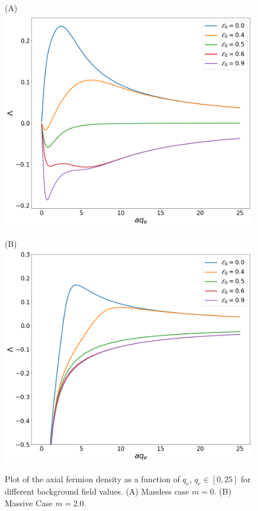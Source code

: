 \begin{figure}[h]
	\begin{minipage}{.5\textwidth}
		\centering(A)
		\includegraphics[scale=0.18]{figures/axial_m=00.png}
	\end{minipage}%
	\begin{minipage}{0.5\textwidth}
		\centering(B)
		\includegraphics[scale=0.18]{figures/axial_m=20.png}
	\end{minipage}
	\caption{Plot of the axial fermion density as a function of $q_e$, $q_e\in[0,25]$ for different background field values. (A) Massless case $m=0$. (B) Massive Case $m=2.0$.}\label{fig:axialdensityq}
\end{figure}

